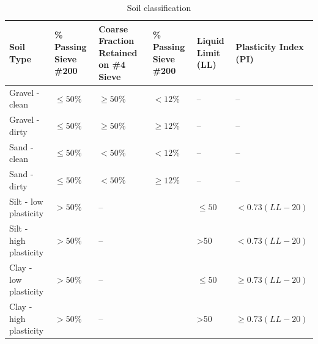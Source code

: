 \documentclass[a4paper,12pt]{article}
\begin{document}
\begin{enumerate}
	
	\begin{landscape}
	\centering
	\vspace*{5em}
	\begin{table}[!h]
		\begin{tabular}{lp{3cm}p{3cm}p{3cm}p{2cm}l}
			\toprule
			\textbf{Soil Type}     & \textbf{\% Passing Sieve \#200} & \textbf{Coarse Fraction Retained on \#4 Sieve} & \textbf{\% Passing Sieve \#200} & \textbf{Liquid Limit (LL)} & \textbf{Plasticity Index (PI)} \\
			\midrule
			Gravel - clean         & $ \le 50 \%$                    & $ \ge 50 \%$                                   & $< 12 \%$                       & --                         & --                             \\
			Gravel - dirty         & $ \le 50 \%$                    & $ \ge 50 \%$                                   & $ \ge 12\%$                     & --                         & --                             \\
			Sand - clean           & $ \le 50 \%$                    & $ < 50 \%$                                     & $< 12 \%$                       & --                         & --                             \\
			Sand - dirty           & $ \le 50 \%$                    & $ < 50 \%$                                     & $ \ge 12\%$                     & --                         & --                             \\
			Silt - low plasticity  & $ > 50 \%$                      & --                                             &                                 & $\le 50$                   & $< 0.73 (LL-20)$               \\
			Silt - high plasticity & $ > 50 \%$                      & --                                             &                                 & \textgreater 50            & $< 0.73 (LL-20)$               \\
			Clay - low plasticity  & $ > 50 \%$                      & --                                             &                                 & $\le 50$                   & $\ge 0.73 (LL-20)$             \\
			Clay - high plasticity & $ > 50 \%$                      & --                                             &                                 & \textgreater 50            & $ \ge 0.73(LL-20)$\\
			\bottomrule            
		\end{tabular}
		\caption{Soil classification}
		\label{table:soil}
	\end{table}
	\end{landscape}


\end{enumerate}
\end{document}
